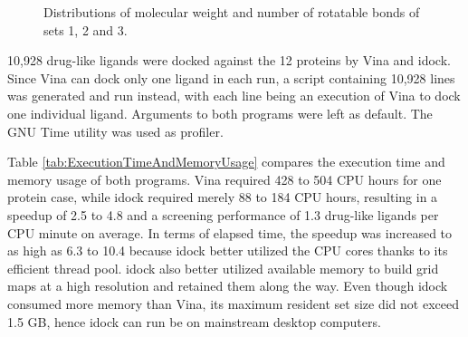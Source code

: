 \documentclass[10pt,conference,compsocconf]{../IEEEtran}
\begin{document}
\begin{figure}
\caption{Distributions of molecular weight and number of rotatable bonds of sets 1, 2 and 3.}
\label{MWT-NRB}
\end{figure}

10,928 drug-like ligands were docked against the 12 proteins by Vina and idock. Since Vina can dock only one ligand in each run, a script containing 10,928 lines was generated and run instead, with each line being an execution of Vina to dock one individual ligand. Arguments to both programs were left as default. The GNU Time utility was used as profiler.

Table \ref{tab:ExecutionTimeAndMemoryUsage} compares the execution time and memory usage of both programs. Vina required 428 to 504 CPU hours for one protein case, while idock required merely 88 to 184 CPU hours, resulting in a speedup of 2.5 to 4.8 and a screening performance of 1.3 drug-like ligands per CPU minute on average. In terms of elapsed time, the speedup was increased to as high as 6.3 to 10.4 because idock better utilized the CPU cores thanks to its efficient thread pool. idock also better utilized available memory to build grid maps at a high resolution and retained them along the way. Even though idock consumed more memory than Vina, its maximum resident set size did not exceed 1.5 GB, hence idock can run be on mainstream desktop computers.
\end{document}
